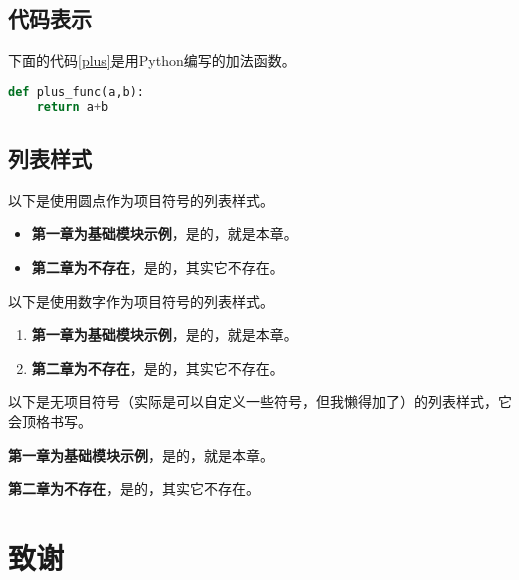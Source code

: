 \documentclass[a4paper,oneside,12pt]{book}
\begin{document}
\section{代码表示}
下面的代码\ref{plus}是用Python编写的加法函数。

\begin{lstlisting}[language=Python, caption=加法, label=plus, tabsize=2]  
def plus_func(a,b):
	return a+b
\end{lstlisting}  

\section{列表样式}

以下是使用圆点作为项目符号的列表样式。

\begin{itemize}
\item \textbf{第一章为基础模块示例}，是的，就是本章。
\item \textbf{第二章为不存在}，是的，其实它不存在。
\end{itemize}

以下是使用数字作为项目符号的列表样式。

\begin{enumerate}
\item \textbf{第一章为基础模块示例}，是的，就是本章。
\item \textbf{第二章为不存在}，是的，其实它不存在。
\end{enumerate}

以下是无项目符号（实际是可以自定义一些符号，但我懒得加了）的列表样式，它会顶格书写。

\begin{description}
\item \textbf{第一章为基础模块示例}，是的，就是本章。
\item \textbf{第二章为不存在}，是的，其实它不存在。
\end{description}
\fi


\clearpage{}


\clearpage{}
\chapter*{致\qquad{}谢}
\normalsize\thankwords
\end{document}
